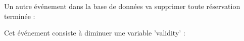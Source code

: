 \documentclass{article}
\begin{document}
\begin{enumerate}
\begin{enumerate}
         \hspace*{-1.05in}
               \noindent{}
         
         
         Un autre événement dans la base de données va supprimer toute réservation terminée :
         
		\hspace*{-1.05in}
               \noindent{}         
         
         
         
         
          Cet événement consiste à diminuer une variable 'validity' :
         

\end{enumerate}
\end{enumerate}
\end{document}
